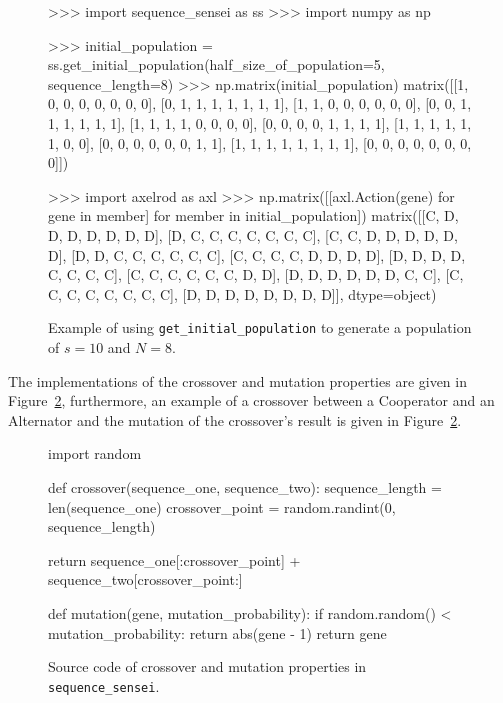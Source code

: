 \begin{figure}[!htbp]
    \begin{usagepy}
>>> import sequence_sensei as ss
>>> import numpy as np

>>> initial_population = ss.get_initial_population(half_size_of_population=5, sequence_length=8)
>>> np.matrix(initial_population)
matrix([[1, 0, 0, 0, 0, 0, 0, 0],
        [0, 1, 1, 1, 1, 1, 1, 1],
        [1, 1, 0, 0, 0, 0, 0, 0],
        [0, 0, 1, 1, 1, 1, 1, 1],
        [1, 1, 1, 1, 0, 0, 0, 0],
        [0, 0, 0, 0, 1, 1, 1, 1],
        [1, 1, 1, 1, 1, 1, 0, 0],
        [0, 0, 0, 0, 0, 0, 1, 1],
        [1, 1, 1, 1, 1, 1, 1, 1],
        [0, 0, 0, 0, 0, 0, 0, 0]])

>>> import axelrod as axl
>>> np.matrix([[axl.Action(gene) for gene in member] for member in initial_population])
matrix([[C, D, D, D, D, D, D, D],
        [D, C, C, C, C, C, C, C],
        [C, C, D, D, D, D, D, D],
        [D, D, C, C, C, C, C, C],
        [C, C, C, C, D, D, D, D],
        [D, D, D, D, C, C, C, C],
        [C, C, C, C, C, C, D, D],
        [D, D, D, D, D, D, C, C],
        [C, C, C, C, C, C, C, C],
        [D, D, D, D, D, D, D, D]], dtype=object)

\end{usagepy}
\caption{Example of using \texttt{get_initial_population} to
generate a population of \(s=10\) and \(N=8\).}\label{fig:get_initial_population_example}
\end{figure}

The implementations of the crossover and mutation properties are given in Figure~\ref{fig:crossover_mutation},
furthermore, an example of a crossover between a Cooperator and an Alternator and the
mutation of the crossover's result is given in Figure~\ref{fig:crossover_mutation}.

\begin{figure}[!htbp]
\begin{sourcepy}
import random

def crossover(sequence_one, sequence_two):
    sequence_length = len(sequence_one)
    crossover_point = random.randint(0, sequence_length)

    return sequence_one[:crossover_point] + sequence_two[crossover_point:]

def mutation(gene, mutation_probability):
    if random.random() < mutation_probability:
        return abs(gene - 1)
    return gene
\end{sourcepy}
\caption{Source code of crossover and mutation properties in \texttt{sequence_sensei}.}\label{fig:crossover_mutation}
\end{figure}


